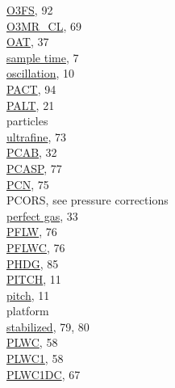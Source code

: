 \documentclass[
  english,
]{book}
\begin{document}
\href{./10-obsolete-variables.html\#o3fs}{O3FS}, 92\\
\href{./6-air-chemistry-measurements.html\#f03-acd\%7C}{O3MR\_CL}, 69\\
\href{./4-the-state-of-the-atmosphere.html\#oat\%7C}{OAT}, 37\\
\href{./2-general-information-about-data-files.html\#synchronization-of-measurements}{sample
time}, 7\\
\href{./2-general-information-about-data-files.html\#bpitchr}{oscillation},
10\\
\href{./10-obsolete-variables.html\#AACT}{PACT}, 94\\
\href{./3-the-state-of-the-aircraft.html\#palt}{PALT}, 21\\
particles\\
\hspace*{0.333em}\hspace*{0.333em}\href{./7-aerosol-particle-measurements.html\#condensation-nucleus-counter}{ultrafine},
73\\
\href{./4-the-state-of-the-atmosphere.html\#p-special}{PCAB}, 32\\
\href{./7-aerosol-particle-measurements.html\#aerosol-spec}{PCASP}, 77\\
\href{./7-aerosol-particle-measurements.html\#pcn}{PCN}, 75\\
PCORS, see pressure corrections\\
\href{./3-the-state-of-the-aircraft.html\#ATX}{perfect gas}, 33\\
\href{./7-aerosol-particle-measurements.html\#pflw}{PFLW}, 76\\
\href{./7-aerosol-particle-measurements.html\#pflw}{PFLWC}, 76\\
\href{./10-obsolete-variables.html\#ltn51}{PHDG}, 85\\
\href{./3-the-state-of-the-aircraft.html\#pitch}{PITCH}, 11\\
\href{./3-the-state-of-the-aircraft.html\#pitch}{pitch}, 11\\
platform\\
\hspace*{0.333em}\hspace*{0.333em}\href{./8-radiation-variables.html\#spx}{stabilized},
79, 80\\
\href{./5-cloud-physics-variables.html\#plwc}{PLWC}, 58\\
\href{./5-cloud-physics-variables.html\#plwc}{PLWC1}, 58\\
\href{./5-cloud-physics-variables.html\#lwc2d}{PLWC1DC}, 67\\
\end{document}

